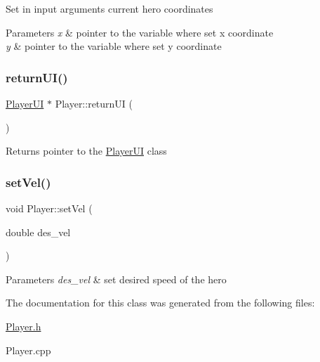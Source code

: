 Set in input arguments current hero coordinates 
\begin{DoxyParams}{Parameters}
{\em x} & pointer to the variable where set x coordinate \\
\hline
{\em y} & pointer to the variable where set y coordinate \\
\hline
\end{DoxyParams}
\mbox{\label{class_player_aefa23e8642f25b0f7e72543599d567f6}} 
\subsubsection{\texorpdfstring{return\+U\+I()}{returnUI()}}
{\footnotesize\ttfamily \hyperlink{class_player_u_i}{Player\+UI} $\ast$ Player\+::return\+UI (\begin{DoxyParamCaption}{ }\end{DoxyParamCaption})}

\begin{DoxyReturn}{Returns}
pointer to the \hyperlink{class_player_u_i}{Player\+UI} class 
\end{DoxyReturn}
\mbox{\label{class_player_ade0e4463e66975e549986ce55cac9467}} 
\subsubsection{\texorpdfstring{set\+Vel()}{setVel()}}
{\footnotesize\ttfamily void Player\+::set\+Vel (\begin{DoxyParamCaption}\item[{double}]{des\+\_\+vel }\end{DoxyParamCaption})}


\begin{DoxyParams}{Parameters}
{\em des\+\_\+vel} & set desired speed of the hero \\
\hline
\end{DoxyParams}


The documentation for this class was generated from the following files\+:\begin{DoxyCompactItemize}
\item 
\hyperlink{_player_8h}{Player.\+h}\item 
Player.\+cpp\end{DoxyCompactItemize}
